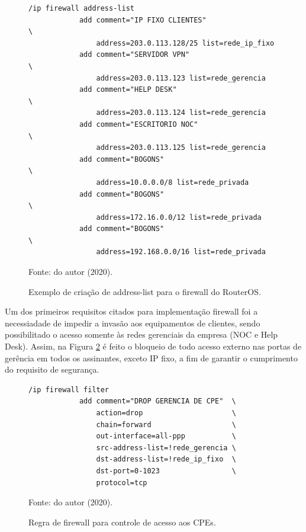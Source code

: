     \begin{figure}[!htb]
        \centering
        \caption{Exemplo de criação de address-list para o firewall do RouterOS.} 
        \label{fig:firewall_addrlist}
        
        \begin{Verbatim}[fontsize=\normalsize]
            /ip firewall address-list
            add comment="IP FIXO CLIENTES"                  \
                address=203.0.113.128/25 list=rede_ip_fixo
            add comment="SERVIDOR VPN"                      \
                address=203.0.113.123 list=rede_gerencia
            add comment="HELP DESK"                         \
                address=203.0.113.124 list=rede_gerencia
            add comment="ESCRITORIO NOC"                    \
                address=203.0.113.125 list=rede_gerencia
            add comment="BOGONS"                            \
                address=10.0.0.0/8 list=rede_privada
            add comment="BOGONS"                            \
                address=172.16.0.0/12 list=rede_privada
            add comment="BOGONS"                            \
                address=192.168.0.0/16 list=rede_privada
        \end{Verbatim} 

        {\small Fonte: do autor (2020).} 
    \end{figure}
    
    Um dos primeiros requisitos citados para implementação firewall foi a necessiadade de impedir a invasão aos equipamentos de clientes, sendo possibilitado o acesso somente às redes gerenciais da empresa (NOC e Help Desk). Assim, na Figura \ref{fig:drop_cpe} é feito o bloqueio de todo acesso externo nas portas de gerência em todos os assinantes, exceto IP fixo, a fim de garantir o cumprimento do requisito de segurança.
    
    \begin{figure}[!htb]
        \centering
        \caption{Regra de firewall para controle de acesso aos CPEs.} 
        \label{fig:drop_cpe}
        
        \begin{Verbatim}[fontsize=\normalsize]
            /ip firewall filter
            add comment="DROP GERENCIA DE CPE"  \
                action=drop                     \
                chain=forward                   \
                out-interface=all-ppp           \
                src-address-list=!rede_gerencia \
                dst-address-list=!rede_ip_fixo  \
                dst-port=0-1023                 \
                protocol=tcp
        \end{Verbatim} 

        {\small Fonte: do autor (2020).} 
    \end{figure}
    

